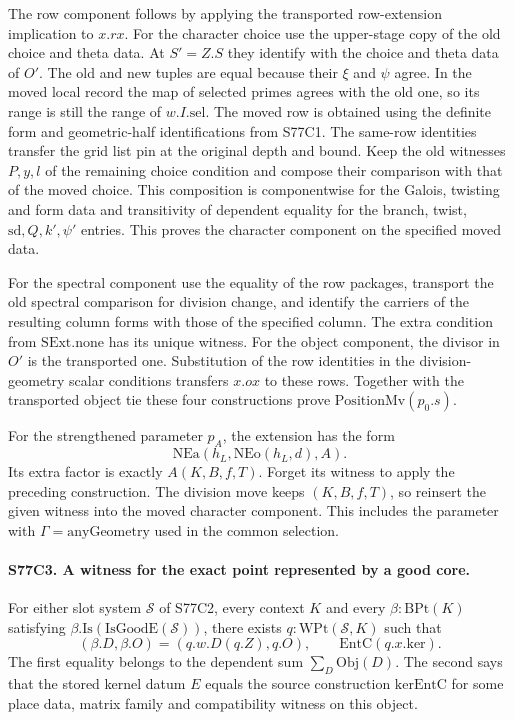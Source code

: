 The row component follows by applying the transported row-extension
implication to $x.rx$. For the character choice use the upper-stage
copy of the old choice and theta data. At $S'=Z.S$ they identify
with the choice and theta data of $O'$. The old and new tuples are
equal because their $\xi$ and $\psi$ agree. In the moved local
record the map of selected primes agrees with the old one, so its
range is still the range of $w.I.\mathrm{sel}$. The moved row is
obtained using the definite form and geometric-half identifications
from S77C1. The same-row identities transfer the grid list pin
at the original depth and bound. Keep the old witnesses $P,y,l$
of the remaining choice condition and compose their comparison
with that of the moved choice. This composition is componentwise
for the Galois, twisting and form data and transitivity of dependent
equality for the branch, twist, $\mathrm{sd},Q,k',\psi'$ entries.
This proves the character component on the specified moved data.

For the spectral component use the equality of the row packages,
transport the old spectral comparison for division change, and
identify the carriers of the resulting column forms with those
of the specified column. The extra condition from
$\mathrm{SExt.none}$ has its unique witness. For the object
component, the divisor in $O'$ is the transported one. Substitution
of the row identities in the division-geometry scalar conditions
transfers $x.ox$ to these rows. Together with the transported object
tie these four constructions prove $\mathrm{PositionMv}(p_0.s)$.

For the strengthened parameter $p_A$, the extension has the form
\[
  \mathrm{NEa}(h_L,\mathrm{NEo}(h_L,d),A).
\]
Its extra factor is exactly $A(K,B,f,T)$. Forget its witness
to apply the preceding construction. The division move keeps
$(K,B,f,T)$, so reinsert the given witness into the moved character
component. This includes the parameter with $\Gamma=\mathrm{anyGeometry}$
used in the common selection.

\paragraph{S77C3. A witness for the exact point represented by a good core.}
For either slot system $\mathcal S$ of S77C2, every context $K$ and
every $\beta:\mathrm{BPt}(K)$ satisfying
$\beta.\mathrm{Is}(\mathrm{IsGoodE}(\mathcal S))$, there exists
$q:\mathrm{WPt}(\mathcal S,K)$ such that
\[
 (\beta.D,\beta.O)=(q.w.D(q.Z),q.O),\qquad
             \mathrm{EntC}(q.x.\mathrm{ker}).
\]
The first equality belongs to the dependent sum $\sum_D\mathrm{Obj}(D)$.
The second says that the stored kernel datum $E$ equals the source
construction $\mathrm{kerEntC}$ for some place data, matrix family
and compatibility witness on this object.


